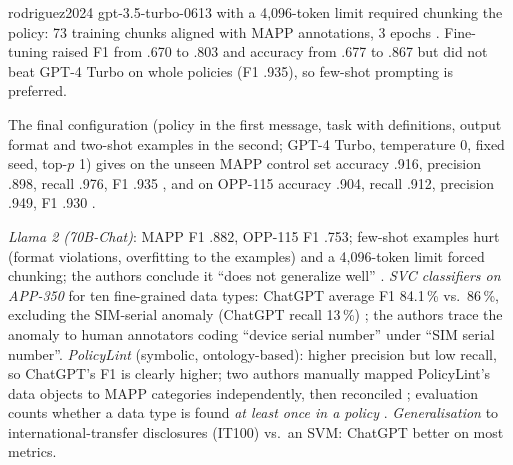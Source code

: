 \begin{papercard}{rodriguez2024}
 gpt-3.5-turbo-0613 with a 4,096-token limit required chunking the policy: 73 training chunks aligned with MAPP annotations, 3 epochs . Fine-tuning raised F1 from .670 to .803 and accuracy from .677 to .867 but did not beat GPT-4 Turbo on whole policies (F1 .935), so few-shot prompting is preferred.

 The final configuration (policy in the first message, task with definitions, output format and two-shot examples in the second; GPT-4 Turbo, temperature 0, fixed seed, top-$p$ 1) gives on the unseen MAPP control set accuracy .916, precision .898, recall .976, F1 .935 , and on OPP-115 accuracy .904, recall .912, precision .949, F1 .930 .

 \emph{Llama 2 (70B-Chat)}: MAPP F1 .882, OPP-115 F1 .753; few-shot examples hurt (format violations, overfitting to the examples) and a 4,096-token limit forced chunking; the authors conclude it ``does not generalize well'' . \emph{SVC classifiers on APP-350} for ten fine-grained data types: ChatGPT average F1 84.1\,\% vs.\ 86\,\%, excluding the SIM-serial anomaly (ChatGPT recall 13\,\%) ; the authors trace the anomaly to human annotators coding ``device serial number'' under ``SIM serial number''. \emph{PolicyLint} (symbolic, ontology-based): higher precision but low recall, so ChatGPT's F1 is clearly higher; two authors manually mapped PolicyLint's data objects to MAPP categories independently, then reconciled ; evaluation counts whether a data type is found \emph{at least once in a policy} . \emph{Generalisation} to international-transfer disclosures (IT100) vs.\ an SVM: ChatGPT better on most metrics.


\end{papercard}
